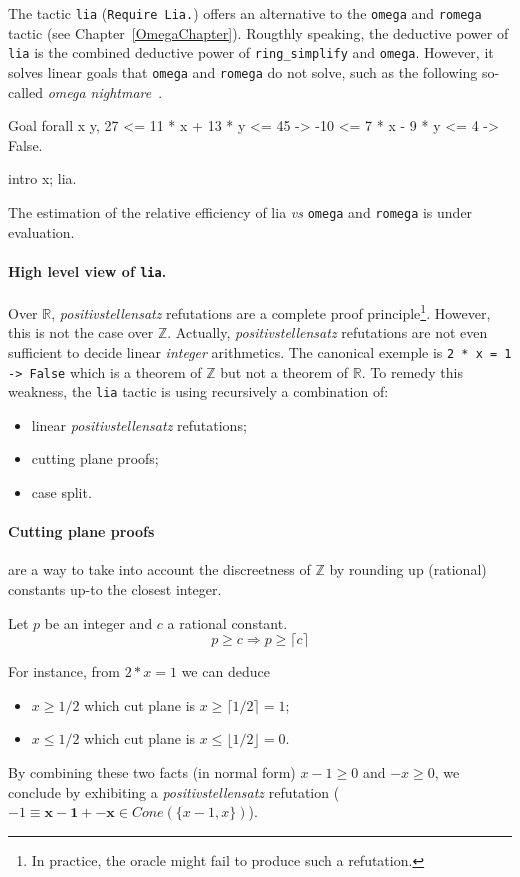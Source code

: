 \label{sec:lia}

The tactic {\tt lia} ({\tt Require Lia.}) offers an alternative to the {\tt omega} and {\tt romega} tactic (see
Chapter~\ref{OmegaChapter}). 
%
Rougthly speaking, the deductive power of {\tt lia} is the combined deductive power of {\tt ring\_simplify} and {\tt omega}.
%
However, it solves linear goals that {\tt omega} and {\tt romega} do not solve, such as the
following so-called \emph{omega nightmare}~\cite{TheOmegaPaper}.
\begin{coq_example*}
  Goal forall x y, 
       27 <= 11 * x + 13 * y <= 45 -> 
       -10 <= 7 * x - 9 * y <= 4 ->   False.
\end{coq_example*}
\begin{coq_eval}
intro x; lia.
\end{coq_eval}
The estimation of the relative efficiency of lia \emph{vs} {\tt omega}
and {\tt romega} is under evaluation.

\paragraph{High level view of {\tt lia}.}
Over $\mathbb{R}$,  \emph{positivstellensatz} refutations are a complete proof principle\footnote{In practice, the oracle might fail to produce such a refutation.}.
%
However, this is not the case over $\mathbb{Z}$.
%
Actually, \emph{positivstellensatz} refutations are not even sufficient to decide linear \emph{integer} 
arithmetics.
%
The canonical exemple is {\tt 2 * x = 1 -> False} which is a theorem of $\mathbb{Z}$ but not a theorem of $\mathbb{R}$.
%
To remedy this weakness, the {\tt lia} tactic is using recursively a combination of:
%
\begin{itemize}
\item linear \emph{positivstellensatz} refutations;
\item cutting plane proofs;
\item case split.
\end{itemize}

\paragraph{Cutting plane proofs} are a way to take into account the discreetness of $\mathbb{Z}$ by rounding up
(rational) constants up-to the closest integer. 
%
\begin{theorem}
  Let $p$ be an integer and $c$ a rational constant.
  \[
  p \ge c \Rightarrow p \ge \lceil c \rceil
  \]
\end{theorem}
For instance, from $2 * x = 1$ we can deduce 
\begin{itemize}
\item $x \ge 1/2$ which cut plane is $ x \ge \lceil 1/2 \rceil = 1$;
\item $ x \le 1/2$ which cut plane is $ x \le \lfloor 1/2 \rfloor = 0$.
\end{itemize}
By combining these two facts (in normal form) $x - 1 \ge 0$ and $-x \ge 0$, we conclude by exhibiting a
\emph{positivstellensatz} refutation ($-1 \equiv \mathbf{x-1} + \mathbf{-x}  \in Cone(\{x-1,x\})$).

